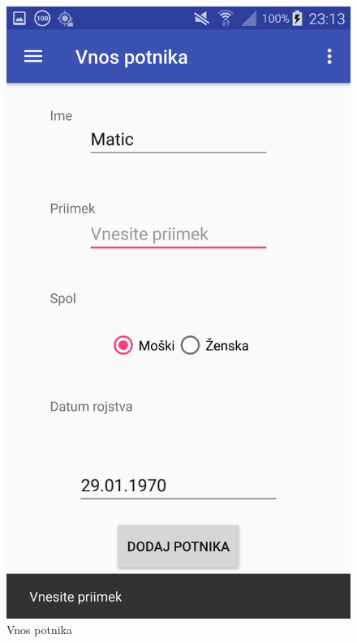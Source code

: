 \documentclass[11pt,a4paper]{article}
\begin{document}
\begin{figure}[htb]
	\centerline{\includegraphics[width=1.0\textwidth]{GUI/vnosPotnika.jpg}}
	\caption{Vnos potnika}
	\label{sl:koncept}
\end{figure}
\end{document}
